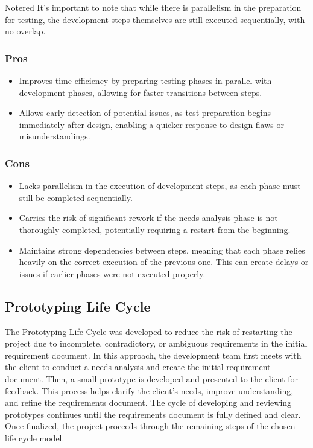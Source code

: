 \vspace{1cm}
\begin{prettyBox}{Note}{red}
 It's important to note that while there is parallelism in the preparation for testing, the development steps themselves are 
still executed sequentially, with no overlap.  
\end{prettyBox}

\vspace{0.5cm}
\subsubsection{Pros}
\begin{itemize}
    \item Improves time efficiency by preparing testing phases in parallel with development phases, allowing for faster transitions between steps.
    \item Allows early detection of potential issues, as test preparation begins immediately after design, enabling a quicker response to design flaws or misunderstandings.
\end{itemize}

\subsubsection{Cons}
\begin{itemize}
    \item Lacks parallelism in the execution of development steps, as each phase must still be completed sequentially.
    \item Carries the risk of significant rework if the needs analysis phase is not thoroughly completed, potentially requiring a restart from the beginning.
    \item Maintains strong dependencies between steps, meaning that each phase relies heavily on the correct execution of the previous one. This can create delays or issues if earlier phases were not executed properly.
\end{itemize}

\vspace{1cm}
\subsection{Prototyping Life Cycle}
The Prototyping Life Cycle was developed to reduce the risk of restarting the project due to incomplete, contradictory, 
or ambiguous requirements in the initial requirement document. 
In this approach, the development team first meets with the client to conduct a needs analysis and create the initial 
requirement document. Then, a small prototype is developed and presented to the client for feedback. This process helps
clarify the client's needs, improve understanding, and refine the requirements document. 
The cycle of developing and reviewing prototypes continues until the requirements document is fully defined and clear. 
Once finalized, the project proceeds through the remaining steps of the chosen life cycle model.


